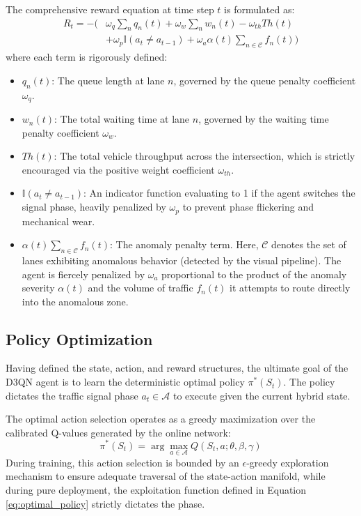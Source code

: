 \documentclass[conference]{IEEEtran}
\begin{document}
The comprehensive reward equation at time step $t$ is formulated as:
\begin{equation}
\begin{aligned}
R_t = - \Big( & \omega_q \sum_{n} q_n(t) + \omega_w \sum_{n} w_n(t) - \omega_{th} Th(t) \\
& + \omega_p \mathbb{I}(a_t \neq a_{t-1}) + \omega_a \alpha(t) \sum_{n \in \mathcal{C}} f_n(t) \Big)
\end{aligned}
\label{eq:reward_function}
\end{equation}
where each term is rigorously defined:
\begin{itemize}
    \item $q_n(t)$: The queue length at lane $n$, governed by the queue penalty coefficient $\omega_q$.
    \item $w_n(t)$: The total waiting time at lane $n$, governed by the waiting time penalty coefficient $\omega_w$.
    \item $Th(t)$: The total vehicle throughput across the intersection, which is strictly encouraged via the positive weight coefficient $\omega_{th}$.
    \item $\mathbb{I}(a_t \neq a_{t-1})$: An indicator function evaluating to 1 if the agent switches the signal phase, heavily penalized by $\omega_p$ to prevent phase flickering and mechanical wear.
    \item $\alpha(t) \sum_{n \in \mathcal{C}} f_n(t)$: The anomaly penalty term. Here, $\mathcal{C}$ denotes the set of lanes exhibiting anomalous behavior (detected by the visual pipeline). The agent is fiercely penalized by $\omega_a$ proportional to the product of the anomaly severity $\alpha(t)$ and the volume of traffic $f_n(t)$ it attempts to route directly into the anomalous zone.
\end{itemize}

\subsection{Policy Optimization}
\label{subsec:policy_opt}

Having defined the state, action, and reward structures, the ultimate goal of the D3QN agent is to learn the deterministic optimal policy $\pi^*(S_t)$. The policy dictates the traffic signal phase $a_t \in \mathcal{A}$ to execute given the current hybrid state.

The optimal action selection operates as a greedy maximization over the calibrated Q-values generated by the online network:
\begin{equation}
\pi^*(S_t) = \arg\max_{a \in \mathcal{A}} Q(S_t, a; \theta, \beta, \gamma)
\label{eq:optimal_policy}
\end{equation}
During training, this action selection is bounded by an $\epsilon$-greedy exploration mechanism to ensure adequate traversal of the state-action manifold, while during pure deployment, the exploitation function defined in Equation \ref{eq:optimal_policy} strictly dictates the phase.
\end{document}
